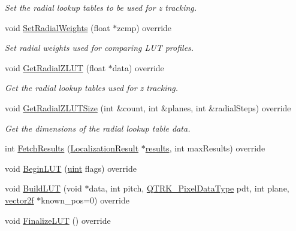 \begin{DoxyCompactItemize}
\begin{DoxyCompactList}\small\item\em Set the radial lookup tables to be used for z tracking. \end{DoxyCompactList}\item 
void \hyperlink{class_queued_c_u_d_a_tracker_a41d97b792daafdc6e7a76af383429f48}{Set\+Radial\+Weights} (float $\ast$zcmp) override
\begin{DoxyCompactList}\small\item\em Set radial weights used for comparing L\+UT profiles. \end{DoxyCompactList}\item 
void \hyperlink{class_queued_c_u_d_a_tracker_a1298fa3749c2ffaf7e48370ca15e3beb}{Get\+Radial\+Z\+L\+UT} (float $\ast$data) override
\begin{DoxyCompactList}\small\item\em Get the radial lookup tables used for z tracking. \end{DoxyCompactList}\item 
void \hyperlink{class_queued_c_u_d_a_tracker_a4af9b4b3778d9cb13823fe486db23ab9}{Get\+Radial\+Z\+L\+U\+T\+Size} (int \&count, int \&planes, int \&radial\+Steps) override
\begin{DoxyCompactList}\small\item\em Get the dimensions of the radial lookup table data. \end{DoxyCompactList}\item 
int \hyperlink{class_queued_c_u_d_a_tracker_acc1a34b83a9f7cc84ede58ce7eaec45e}{Fetch\+Results} (\hyperlink{struct_localization_result}{Localization\+Result} $\ast$\hyperlink{class_queued_c_u_d_a_tracker_af29d9427d57a9041fbc581d6e8b0efbf}{results}, int max\+Results) override
\item 
void \hyperlink{class_queued_c_u_d_a_tracker_ac6a9934c5a2bd06ecb503abace83c222}{Begin\+L\+UT} (\hyperlink{std__incl_8h_a91ad9478d81a7aaf2593e8d9c3d06a14}{uint} flags) override
\item 
void \hyperlink{class_queued_c_u_d_a_tracker_a16da9256e496b6689079330a062c7529}{Build\+L\+UT} (void $\ast$data, int pitch, \hyperlink{qtrk__c__api_8h_aad82367b3ea592a142bb50a2fb538b0b}{Q\+T\+R\+K\+\_\+\+Pixel\+Data\+Type} pdt, int plane, \hyperlink{std__incl_8h_aba974726076ec2d63a67114c536d123e}{vector2f} $\ast$known\+\_\+pos=0) override
\item 
void \hyperlink{class_queued_c_u_d_a_tracker_a628a79df6cce9a1df9a4da78da266578}{Finalize\+L\+UT} () override
\item 

\end{DoxyCompactItemize}
